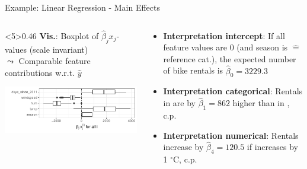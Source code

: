 \documentclass[11pt,compress,t,notes=noshow, aspectratio=169, xcolor=table]{beamer}
\begin{document}
\begin{frame}{Example: Linear Regression - Main Effects}
\lz
\begin{columns}[T, totalwidth=\linewidth]
\begin{column}<5>{0.46\textwidth}
\textbf{Vis.}: Boxplot of $\hat\beta_j x_j$-values (scale invariant)\\
$\leadsto$ Comparable feature contributions w.r.t. $\hat y$

\includegraphics[width = \textwidth]{figure/plot_lin_effect.pdf}

%
\end{column}\hfill
\begin{column}{0.54\textwidth}  %

\begin{itemize}[<+->]
    \item \textbf{Interpretation intercept}:
    If all feature values are 0 (and season is  $\hat =$ reference cat.), the expected number of bike rentals is $\hat\beta_0 = 3229.3$
    \item \textbf{Interpretation categorical}: Rentals in  are by $\hat\beta_1 = 862$ higher than in , c.p.
    \item \textbf{Interpretation numerical}: Rentals increase by $\hat\beta_4 = 120.5$ if  increases by 1 $^{\circ}$C, c.p.

\end{itemize}
\end{column}
\end{columns}
\end{frame}
\end{document}
